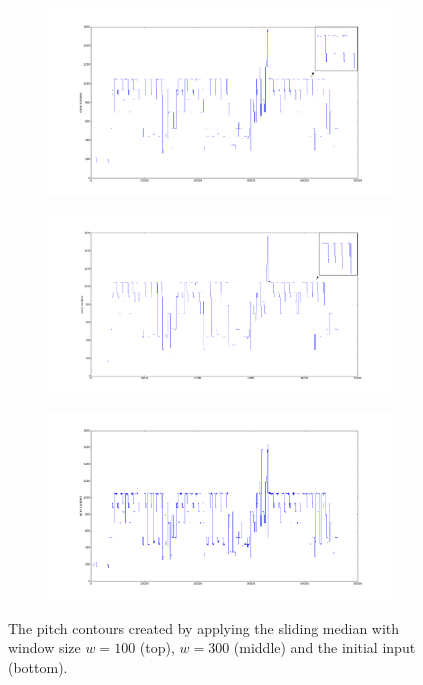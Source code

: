 \begin{figure}
		\vspace{-17pt}
        \centering
 		\begin{subfigure}[b]{\textwidth}
                \includegraphics[width=\textwidth]{Figures/sliding_100}
        \end{subfigure}
        \begin{subfigure}[b]{\textwidth}
                \includegraphics[width=\textwidth]{Figures/sliding_300}
        \end{subfigure}
        \begin{subfigure}[b]{\textwidth}
                \includegraphics[width=\textwidth]{Figures/input_simple}
        \end{subfigure}
    \caption{The pitch contours created by applying the sliding median with window size $w = 100$ (top), $w = 300$ (middle) and the initial input (bottom).}
	\label{fig:sliding_comp}
\end{figure}

